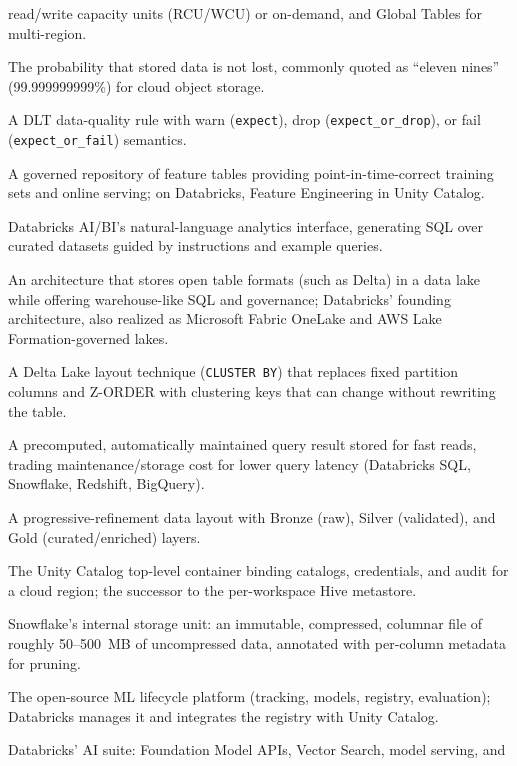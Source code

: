 \begin{description}
    read/write capacity units (RCU/WCU) or on-demand, and Global Tables for multi-region.
  \item[Durability] The probability that stored data is not lost, commonly quoted as ``eleven nines''
    (99.999999999\%) for cloud object storage.
  \item[Expectation] A DLT data-quality rule with warn (\texttt{expect}), drop
    (\texttt{expect\_or\_drop}), or fail (\texttt{expect\_or\_fail}) semantics.
  \item[Feature Store] A governed repository of feature tables providing point-in-time-correct
    training sets and online serving; on Databricks, Feature Engineering in Unity Catalog.
  \item[Genie] Databricks AI/BI's natural-language analytics interface, generating SQL over curated
    datasets guided by instructions and example queries.
  \item[Lakehouse] An architecture that stores open table formats (such as Delta) in a data lake while
    offering warehouse-like SQL and governance; Databricks' founding architecture, also realized as
    Microsoft Fabric OneLake and AWS Lake Formation-governed lakes.
  \item[Liquid clustering] A Delta Lake layout technique (\texttt{CLUSTER BY}) that replaces fixed
    partition columns and Z-ORDER with clustering keys that can change without rewriting the table.
  \item[Materialized view] A precomputed, automatically maintained query result stored for fast reads,
    trading maintenance/storage cost for lower query latency (Databricks SQL, Snowflake, Redshift,
    BigQuery).
  \item[Medallion architecture] A progressive-refinement data layout with Bronze (raw), Silver
    (validated), and Gold (curated/enriched) layers.
  \item[Metastore] The Unity Catalog top-level container binding catalogs, credentials, and audit for
    a cloud region; the successor to the per-workspace Hive metastore.
  \item[Micro-partition] Snowflake's internal storage unit: an immutable, compressed, columnar file of
    roughly 50--500~MB of uncompressed data, annotated with per-column metadata for pruning.
  \item[MLflow] The open-source ML lifecycle platform (tracking, models, registry, evaluation);
    Databricks manages it and integrates the registry with Unity Catalog.
  \item[Mosaic AI] Databricks' AI suite: Foundation Model APIs, Vector Search, model serving, and

\end{description}
